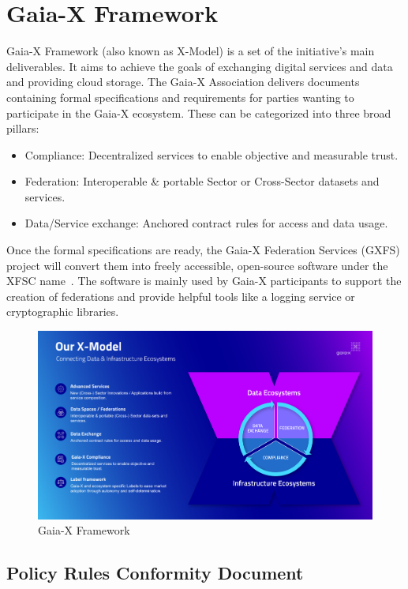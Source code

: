 \section{Gaia-X Framework}\label{sec:gaia-x-framework}

Gaia-X Framework (also known as X-Model) is a set of the initiative's main deliverables.
It aims to achieve the goals of exchanging digital services and data and providing cloud storage.
The Gaia-X Association delivers documents containing formal specifications and requirements for parties wanting to participate in the Gaia-X ecosystem.
These can be categorized into three broad pillars:
\begin{itemize}
    \item Compliance: Decentralized services to enable objective and measurable trust.
    \item Federation: Interoperable \& portable Sector or Cross-Sector datasets and services.
    \item Data/Service exchange: Anchored contract rules for access and data usage.
\end{itemize}

Once the formal specifications are ready, the Gaia-X Federation Services (GXFS) project will convert them into freely accessible, open-source software under the XFSC name~\cite{gxfs}.
The software is mainly used by Gaia-X participants to support the creation of federations and provide helpful tools like a logging service or cryptographic libraries.

\begin{figure}
    \centering
    \includegraphics[width=\textwidth]{figures/x-model.png}
    \caption{Gaia-X Framework~\cite{gaiax}}\label{fig:gaiax-x-model}
\end{figure}

\subsection{Policy Rules Conformity Document}\label{subsec:policy-rules-conformity-document}

